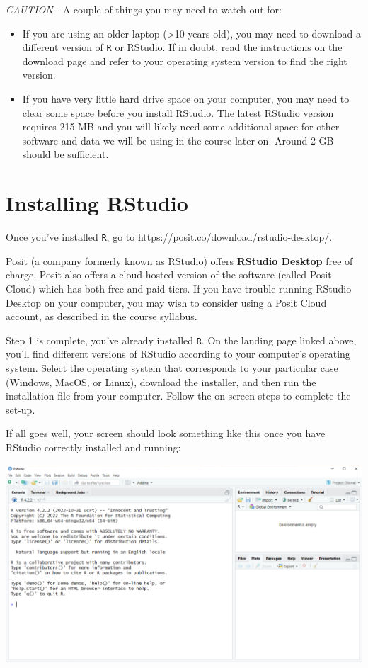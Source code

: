 \documentclass[
]{book}
\begin{document}
\emph{CAUTION} - A couple of things you may need to watch out for:

\begin{itemize}
\item
  If you are using an older laptop (\textgreater10 years old), you may need to download a different version of \texttt{R} or RStudio. If in doubt, read the instructions on the download page and refer to your operating system version to find the right version.
\item
  If you have very little hard drive space on your computer, you may need to clear some space before you install RStudio. The latest RStudio version requires 215 MB and you will likely need some additional space for other software and data we will be using in the course later on. Around 2 GB should be sufficient.
\end{itemize}

\hypertarget{installing-rstudio}{%
\section{Installing RStudio}\label{installing-rstudio}}

Once you've installed \texttt{R}, go to \url{https://posit.co/download/rstudio-desktop/}.

Posit (a company formerly known as RStudio) offers \textbf{RStudio Desktop} free of charge. Posit also offers a cloud-hosted version of the software (called Posit Cloud) which has both free and paid tiers. If you have trouble running RStudio Desktop on your computer, you may wish to consider using a Posit Cloud account, as described in the course syllabus.

Step 1 is complete, you've already installed \texttt{R}. On the landing page linked above, you'll find different versions of RStudio according to your computer's operating system. Select the operating system that corresponds to your particular case (Windows, MacOS, or Linux), download the installer, and then run the installation file from your computer. Follow the on-screen steps to complete the set-up.

If all goes well, your screen should look something like this once you have RStudio correctly installed and running:

\includegraphics{docs/_main_files/figure-html/RStudio clean install.png}
\end{document}
